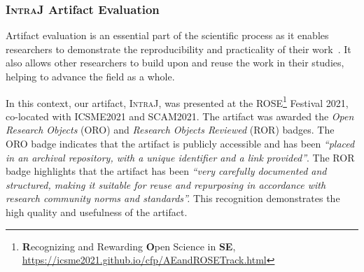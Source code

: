 \subsubsection{\textsc{IntraJ} Artifact Evaluation}
Artifact evaluation is an essential part of the scientific process as it enables
researchers to demonstrate the reproducibility and practicality of their work~\cite{KrishnamurthiArtifact2013}.
It also allows other researchers to build upon and reuse the work in their
studies, helping to advance the field as a whole.

In this context, our artifact, \textsc{IntraJ}, was presented at the
ROSE\footnote{\textbf{R}ecognizing and Rewarding \textbf{O}pen Science in \textbf{SE},
\url{https://icsme2021.github.io/cfp/AEandROSETrack.html}} Festival 2021,
co-located with ICSME2021 and SCAM2021. The artifact was awarded the \emph{Open Research Objects}
(ORO) and \emph{Research Objects Reviewed} (ROR) badges.
The ORO badge indicates that the artifact is publicly accessible and has been
\emph{``placed in an archival repository, with a unique identifier and a link provided''}.
The ROR badge highlights that the artifact has been
\emph{``very carefully documented and structured, making it suitable for reuse and repurposing
in accordance with research community norms and standards''.} This recognition
demonstrates the high quality and usefulness of the artifact.

